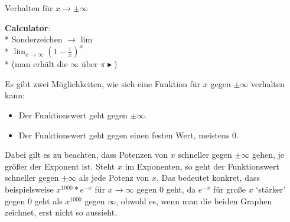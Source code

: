 \begin{bla}{Verhalten für $x\rightarrow \pm \infty$}
  \begin{marginfigure}
    \begin{tcolorbox}[colback=white!95!black,colframe=white!75!black,title=CAS:,arc=0mm]
      \begin{scriptsize}
        \textbf{Calculator}: \\*
        Sonderzeichen \( \to \) lim \\*
        \hfill \( \lim_{x \to \infty} {\left( 1- \tfrac{1}{x} \right)}^x \) \\*
        (man erhält die \( \infty \) über \( \pi \blacktriangleright \))
      \end{scriptsize}
    \end{tcolorbox}
  \end{marginfigure}
  \begin{marginfigure}
      \caption{$f(x)=e^{-x}$ geht für $x\rightarrow\infty$ gegen $0$.}
    \end{marginfigure}
  Es gibt zwei Möglichkeiten, wie sich eine Funktion für $x$ gegen $\pm \infty$ verhalten kann:
  \begin{itemize}
    \item Der Funktionswert geht gegen $\pm \infty$.
    \item Der Funktionswert geht gegen einen festen Wert, meistens $0$.
  \end{itemize}
  Dabei gilt es zu beachten, dass Potenzen von $x$ schneller gegen $\pm \infty$ gehen, je größer der Exponent ist. Steht $x$ im Exponenten, so geht der Funktionswert schneller gegen $\pm \infty$ als jede Potenz von $x$. Das bedeutet konkret, dass beispielsweise $x^{1000}*e^{-x}$ für $x \rightarrow \infty$ gegen $0$ geht, da $e^{-x}$ für große $x$ `stärker' gegen $0$ geht als $x^{1000}$ gegen $\infty$, obwohl es, wenn man die beiden Graphen zeichnet, erst nicht so aussieht.
\end{bla}



